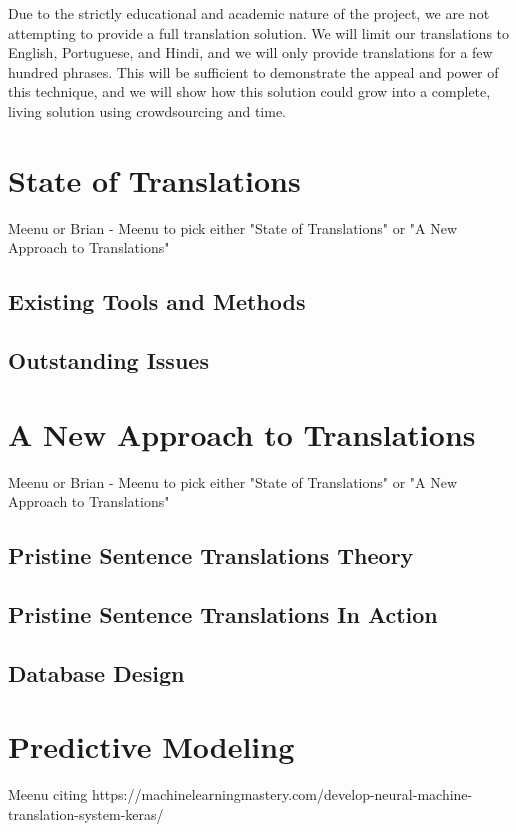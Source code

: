 \documentclass[runningheads]{llncs}
\begin{document}
	Due to the strictly educational and academic nature of the project, we are not attempting to provide a full translation solution. We will limit our translations to English, Portuguese, and Hindi, and we will only provide translations for a few hundred phrases. This will be sufficient to demonstrate the appeal and power of this technique, and we will show how this solution could grow into a complete, living solution using crowdsourcing and time. 
	
	\section{State of Translations}
	Meenu or Brian - Meenu to pick either "State of Translations" or "A New Approach to Translations"
	
	\subsection{Existing Tools and Methods}
	
	\subsection{Outstanding Issues}
	
	\section{A New Approach to Translations}
	Meenu or Brian - Meenu to pick either "State of Translations" or "A New Approach to Translations"
	
	\subsection{Pristine Sentence Translations Theory}
	
	\subsection{Pristine Sentence Translations In Action}
	
	\subsection{Database Design}
	
	\section{Predictive Modeling}
	Meenu citing https://machinelearningmastery.com/develop-neural-machine-translation-system-keras/
	
\end{document}
